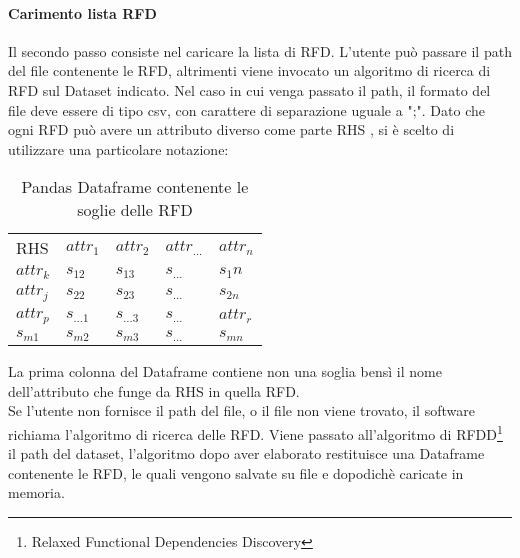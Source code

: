 \paragraph{Carimento lista RFD}
Il secondo passo consiste nel caricare la lista di RFD. L'utente può passare il path del file contenente le RFD, altrimenti viene invocato un algoritmo di ricerca di RFD sul Dataset indicato.
Nel caso in cui venga passato il path, il formato del file deve essere di tipo csv, con carattere di separazione uguale a ";".
Dato che ogni RFD può avere un attributo diverso come parte RHS , si è scelto di utilizzare una particolare notazione:
\begin{table}[H]
    \centering
    \begin{tabular}{l l l l l }
     RHS & $attr_1$ & $attr_2$ & $attr_{\ldots}$ & $attr_n$ \\
    $attr_{k}$ & $s_{12}$ & $s_{13}$ & $s_{\ldots}$ & $s_1n$  \\
    $attr_{j}$ & $s_{22}$ & $s_{23}$  & $s_{\ldots}$ & $s_{2n}$\\
    $attr_{p}$ & $s_{\ldots1}$ & $s_{\ldots3}$  & $s_{\ldots}$ & $attr_{r}$\\
    $s_{m1}$ & $s_{m2}$ & $s_{m3}$ & $s_{\ldots}$ & $s_{mn}$\\
    \end{tabular}
    \caption{Pandas Dataframe contenente le soglie delle RFD}
    \label{tab:RFD_notation}
\end{table}

La prima colonna del Dataframe contiene non una soglia bensì il nome dell'attributo che funge da RHS in quella RFD.
\\
Se l'utente non fornisce il path del file, o il file non viene trovato, il software richiama l'algoritmo di ricerca delle RFD. Viene passato all'algoritmo di RFDD\footnote{Relaxed Functional Dependencies Discovery} il path del dataset, l'algoritmo dopo aver elaborato restituisce una Dataframe contenente le RFD, le quali vengono salvate su file e dopodichè caricate in memoria.
